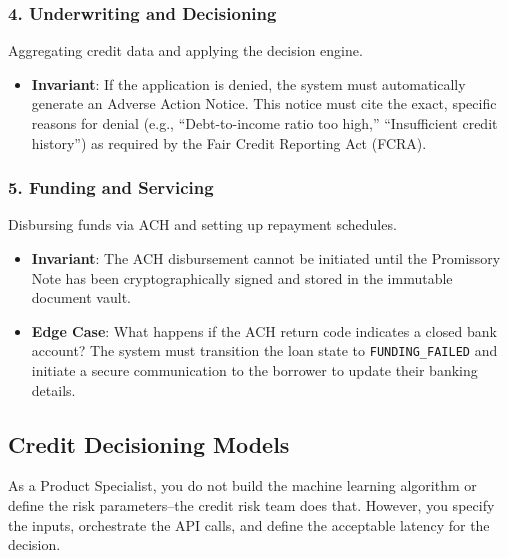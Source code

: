 \documentclass[
  11pt,
  openany,
  oneside]{book}
\providecommand{\tightlist}{%
  \setlength{\itemsep}{0pt}\setlength{\parskip}{0pt}}
\begin{document}
\subsubsection{4. Underwriting and
Decisioning}\label{underwriting-and-decisioning}

Aggregating credit data and applying the decision engine.

\begin{itemize}
\tightlist
\item
  \textbf{Invariant}: If the application is denied, the system must
  automatically generate an Adverse Action Notice. This notice must cite
  the exact, specific reasons for denial (e.g., ``Debt-to-income ratio
  too high,'' ``Insufficient credit history'') as required by the Fair
  Credit Reporting Act (FCRA).
\end{itemize}

\subsubsection{5. Funding and Servicing}\label{funding-and-servicing}

Disbursing funds via ACH and setting up repayment schedules.

\begin{itemize}
\tightlist
\item
  \textbf{Invariant}: The ACH disbursement cannot be initiated until the
  Promissory Note has been cryptographically signed and stored in the
  immutable document vault.
\item
  \textbf{Edge Case}: What happens if the ACH return code indicates a
  closed bank account? The system must transition the loan state to
  \texttt{FUNDING\_FAILED} and initiate a secure communication to the
  borrower to update their banking details.
\end{itemize}

\subsection{Credit Decisioning Models}\label{credit-decisioning-models}

As a Product Specialist, you do not build the machine learning algorithm
or define the risk parameters--the credit risk team does that. However,
you specify the inputs, orchestrate the API calls, and define the
acceptable latency for the decision.
\end{document}
